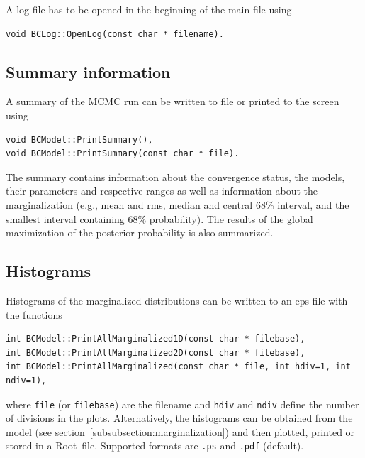 \documentclass[11pt, a4paper]{article}
\newcommand{\Root}{{\sc Root}}
\begin{document}
A log file has to be opened in the beginning of the main file using
%
\begin{verbatim}
void BCLog::OpenLog(const char * filename).
\end{verbatim}


\subsection{Summary information}

A summary of the MCMC run can be written to file or printed to the
screen using
%
\begin{verbatim}
void BCModel::PrintSummary(),
void BCModel::PrintSummary(const char * file).
\end{verbatim}

The summary contains information about the convergence status, the
models, their parameters and respective ranges as well as information
about the marginalization (e.g., mean and rms, median and central 68\%
interval, and the smallest interval containing 68\% probability). The
results of the global maximization of the posterior probability is
also summarized.


\subsection{Histograms}

Histograms of the marginalized distributions can be written to an
eps file with the functions
%
\begin{verbatim}
int BCModel::PrintAllMarginalized1D(const char * filebase),
int BCModel::PrintAllMarginalized2D(const char * filebase),
int BCModel::PrintAllMarginalized(const char * file, int hdiv=1, int ndiv=1),
\end{verbatim}
%
where \verb|file| (or \verb|filebase|) are the filename and
\verb|hdiv| and \verb|ndiv| define the number of divisions in the
plots. Alternatively, the histograms can be obtained from the model
(see section~\ref{subsubsection:marginalization}) and then plotted,
printed or stored in a \Root\ file. Supported formats are \verb|.ps|
and \verb|.pdf| (default).
\end{document}
